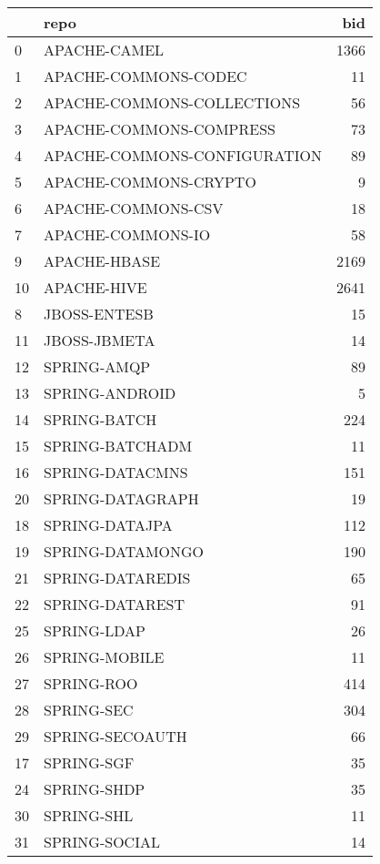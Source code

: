 \begin{tabular}{llr}
\toprule
{} &                   repo &   bid \\
\midrule
0  &           APACHE-CAMEL &  1366 \\
1  &          APACHE-COMMONS-CODEC &    11 \\
2  &    APACHE-COMMONS-COLLECTIONS &    56 \\
3  &       APACHE-COMMONS-COMPRESS &    73 \\
4  &  APACHE-COMMONS-CONFIGURATION &    89 \\
5  &         APACHE-COMMONS-CRYPTO &     9 \\
6  &            APACHE-COMMONS-CSV &    18 \\
7  &             APACHE-COMMONS-IO &    58 \\
9  &           APACHE-HBASE &  2169 \\
10 &            APACHE-HIVE &  2641 \\
8  &           JBOSS-ENTESB &    15 \\
11 &           JBOSS-JBMETA &    14 \\
12 &            SPRING-AMQP &    89 \\
13 &         SPRING-ANDROID &     5 \\
14 &           SPRING-BATCH &   224 \\
15 &        SPRING-BATCHADM &    11 \\
16 &        SPRING-DATACMNS &   151 \\
20 &       SPRING-DATAGRAPH &    19 \\
18 &         SPRING-DATAJPA &   112 \\
19 &       SPRING-DATAMONGO &   190 \\
21 &       SPRING-DATAREDIS &    65 \\
22 &        SPRING-DATAREST &    91 \\
25 &            SPRING-LDAP &    26 \\
26 &          SPRING-MOBILE &    11 \\
27 &             SPRING-ROO &   414 \\
28 &             SPRING-SEC &   304 \\
29 &        SPRING-SECOAUTH &    66 \\
17 &             SPRING-SGF &    35 \\
24 &            SPRING-SHDP &    35 \\
30 &             SPRING-SHL &    11 \\
31 &          SPRING-SOCIAL &    14 \\

\end{tabular}
